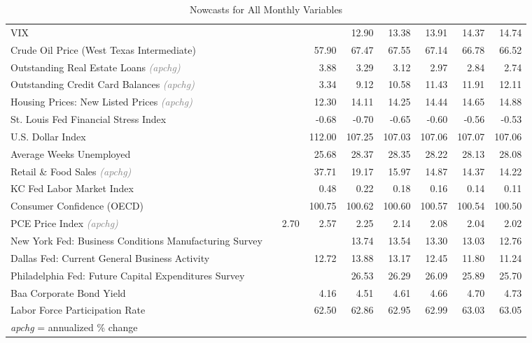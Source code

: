 \documentclass[11pt, letterpaper]{article}\usepackage[]{graphicx}\usepackage[]{color}
\begin{document}
\begin{table}[H]
\begin{tabular}{lrrrrrrrr}
  VIX &  &  &  & 12.90 & 13.38 & 13.91 & 14.37 & 14.74 \\ 
  Crude Oil Price (West Texas Intermediate) &  &  & 57.90 & 67.47 & 67.55 & 67.14 & 66.78 & 66.52 \\ 
  Outstanding Real Estate Loans \textit{\footnotesize\textcolor{gray}{(apchg)}} &  &  & 3.88 & 3.29 & 3.12 & 2.97 & 2.84 & 2.74 \\ 
  Outstanding Credit Card Balances \textit{\footnotesize\textcolor{gray}{(apchg)}} &  &  & 3.34 & 9.12 & 10.58 & 11.43 & 11.91 & 12.11 \\ 
  Housing Prices: New Listed Prices \textit{\footnotesize\textcolor{gray}{(apchg)}} &  &  & 12.30 & 14.11 & 14.25 & 14.44 & 14.65 & 14.88 \\ 
  St. Louis Fed Financial Stress Index &  &  & -0.68 & -0.70 & -0.65 & -0.60 & -0.56 & -0.53 \\ 
  U.S. Dollar Index &  &  & 112.00 & 107.25 & 107.03 & 107.06 & 107.07 & 107.06 \\ 
  Average Weeks Unemployed &  &  & 25.68 & 28.37 & 28.35 & 28.22 & 28.13 & 28.08 \\ 
  Retail \& Food Sales \textit{\footnotesize\textcolor{gray}{(apchg)}} &  &  & 37.71 & 19.17 & 15.97 & 14.87 & 14.37 & 14.22 \\ 
  KC Fed Labor Market Index &  &  & 0.48 & 0.22 & 0.18 & 0.16 & 0.14 & 0.11 \\ 
  Consumer Confidence (OECD) &  &  & 100.75 & 100.62 & 100.60 & 100.57 & 100.54 & 100.50 \\ 
  PCE Price Index \textit{\footnotesize\textcolor{gray}{(apchg)}} &  & 2.70 & 2.57 & 2.25 & 2.14 & 2.08 & 2.04 & 2.02 \\ 
  New York Fed: Business Conditions Manufacturing Survey &  &  &  & 13.74 & 13.54 & 13.30 & 13.03 & 12.76 \\ 
  Dallas Fed: Current General Business Activity &  &  & 12.72 & 13.88 & 13.17 & 12.45 & 11.80 & 11.24 \\ 
  Philadelphia Fed: Future Capital Expenditures Survey &  &  &  & 26.53 & 26.29 & 26.09 & 25.89 & 25.70 \\ 
  Baa Corporate Bond Yield &  &  & 4.16 & 4.51 & 4.61 & 4.66 & 4.70 & 4.73 \\ 
  Labor Force Participation Rate &  &  & 62.50 & 62.86 & 62.95 & 62.99 & 63.03 & 63.05 \\ 
   \hline 
 \textit{apchg} = annualized \% change 
\end{tabular}
\endgroup
\caption{Nowcasts for All Monthly Variables} 
\end{table}
\end{document}
